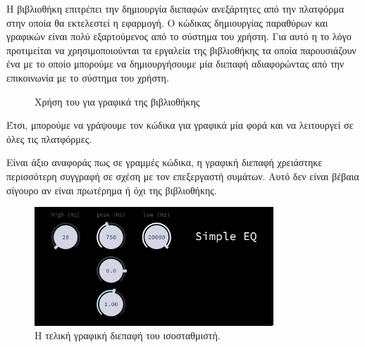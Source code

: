 \documentclass[12pt]{extarticle}
\begin{document}
Η βιβλιοθήκη  επιτρέπει την δημιουργία διεπαφών 
ανεξάρτητες από την πλατφόρμα στην οποία θα εκτελεστεί η εφαρμογή. 
Ο κώδικας δημιουργίας παραθύρων και γραφικών είναι πολύ εξαρτούμενος από 
το σύστημα του χρήστη. Για αυτό η το λόγο προτιμείται να χρησιμοποιούνται 
τα εργαλεία της βιβλιοθήκης τα οποία παρουσιάζουν ένα  
με το οποίο μπορούμε να δημιουργήσουμε μία διεπαφή αδιαφορώντας από την 
 επικοινωνία με το σύστημα του χρήστη.



\begin{figure}[htpb]
    \centering
    \caption{Χρήση του  για γραφικά της βιβλιοθήκης }
\end{figure}

Έτσι, μπορούμε να γράψουμε τον κώδικα για γραφικά μία φορά και 
να λειτουργεί σε όλες τις πλατφόρμες.

Είναι άξιο αναφοράς πως σε γραμμές κώδικα, η γραφική διεπαφή χρειάστηκε 
περισσότερη συγγραφή σε σχέση με τον επεξεργαστή συμάτων. 
Αυτό δεν είναι βέβαια σίγουρο αν είναι πρωτέρημα ή όχι της βιβλιοθήκης.

\begin{figure}[htpb]
    \centering
    \includegraphics[width=0.8\textwidth]{./assets/GUI.png}
    \caption{Η τελική γραφική διεπαφή του ισοσταθμιστή.}
    \label{fig:finalgui}
\end{figure}
\end{document}
